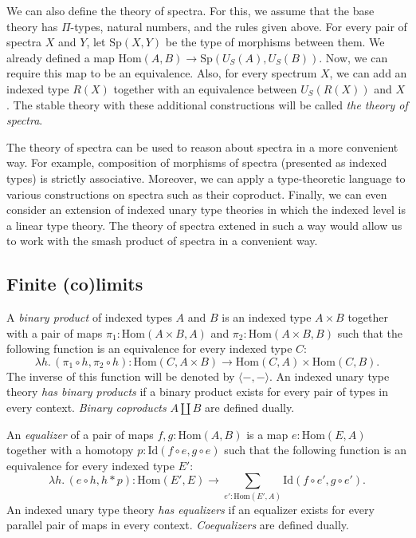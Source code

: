 \documentclass[reqno]{mscs}
\newcommand{\fs}[1]{\mathrm{#1}}
\newcommand{\Hom}{\fs{Hom}}
\newcommand{\Id}{\fs{Id}}
\numberwithin{figure}{section}
\begin{document}
We can also define the theory of spectra.
For this, we assume that the base theory has $\Pi$-types, natural numbers, and the rules given above.
For every pair of spectra $X$ and $Y$, let $\fs{Sp}(X,Y)$ be the type of morphisms between them.
We already defined a map $\Hom(A,B) \to \fs{Sp}(U_S(A),U_S(B))$.
Now, we can require this map to be an equivalence.
Also, for every spectrum $X$, we can add an indexed type $R(X)$ together with an equivalence between $U_S(R(X))$ and $X$.
The stable theory with these additional constructions will be called \emph{the theory of spectra}.

The theory of spectra can be used to reason about spectra in a more convenient way.
For example, composition of morphisms of spectra (presented as indexed types) is strictly associative.
Moreover, we can apply a type-theoretic language to various constructions on spectra such as their coproduct.
Finally, we can even consider an extension of indexed unary type theories in which the indexed level is a linear type theory.
The theory of spectra extened in such a way would allow us to work with the smash product of spectra in a convenient way.

\subsection{Finite (co)limits}
\label{sec:finite-limits}

A \emph{binary product} of indexed types $A$ and $B$ is an indexed type $A \times B$ together with a pair of maps $\pi_1 : \Hom(A \times B, A)$ and $\pi_2 : \Hom(A \times B, B)$
such that the following function is an equivalence for every indexed type $C$:
\[ \lambda h.\,(\pi_1 \circ h, \pi_2 \circ h) : \Hom(C, A \times B) \to \Hom(C,A) \times \Hom(C,B). \]
The inverse of this function will be denoted by $\langle -, - \rangle$.
An indexed unary type theory \emph{has binary products} if a binary product exists for every pair of types in every context.
\emph{Binary coproducts} $A \amalg B$ are defined dually.

An \emph{equalizer} of a pair of maps $f,g : \Hom(A,B)$ is a map $e : \Hom(E,A)$ together with a homotopy $p : \Id(f \circ e, g \circ e)$
such that the following function is an equivalence for every indexed type $E'$:
\[ \lambda h.\,(e \circ h, h * p) : \Hom(E', E) \to \sum_{e' : \Hom(E',A)} \Id(f \circ e', g \circ e'). \]
An indexed unary type theory \emph{has equalizers} if an equalizer exists for every parallel pair of maps in every context.
\emph{Coequalizers} are defined dually.
\end{document}
